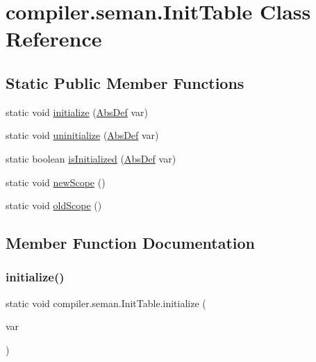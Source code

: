 \hypertarget{classcompiler_1_1seman_1_1_init_table}{}\section{compiler.\+seman.\+Init\+Table Class Reference}
\label{classcompiler_1_1seman_1_1_init_table}
\subsection*{Static Public Member Functions}
\begin{DoxyCompactItemize}
\item 
static void \hyperlink{classcompiler_1_1seman_1_1_init_table_ab1bc216d1fafab32217ef254b68c9569}{initialize} (\hyperlink{classcompiler_1_1abstr_1_1tree_1_1def_1_1_abs_def}{Abs\+Def} var)
\item 
static void \hyperlink{classcompiler_1_1seman_1_1_init_table_a77136e3337120c94621ca98e211672e0}{uninitialize} (\hyperlink{classcompiler_1_1abstr_1_1tree_1_1def_1_1_abs_def}{Abs\+Def} var)
\item 
static boolean \hyperlink{classcompiler_1_1seman_1_1_init_table_af03875273105668a82c23c4da49e0858}{is\+Initialized} (\hyperlink{classcompiler_1_1abstr_1_1tree_1_1def_1_1_abs_def}{Abs\+Def} var)
\item 
static void \hyperlink{classcompiler_1_1seman_1_1_init_table_aef306a1b29699a969e78a1092a8976f5}{new\+Scope} ()
\item 
static void \hyperlink{classcompiler_1_1seman_1_1_init_table_a1c39e093ff7b12c970174aec391c9c4c}{old\+Scope} ()
\end{DoxyCompactItemize}


\subsection{Member Function Documentation}
\mbox{\label{classcompiler_1_1seman_1_1_init_table_ab1bc216d1fafab32217ef254b68c9569}} 
\subsubsection{\texorpdfstring{initialize()}{initialize()}}
{\footnotesize\ttfamily static void compiler.\+seman.\+Init\+Table.\+initialize (\begin{DoxyParamCaption}\item[{\hyperlink{classcompiler_1_1abstr_1_1tree_1_1def_1_1_abs_def}{Abs\+Def}}]{var }\end{DoxyParamCaption})\hspace{0.3cm}{\ttfamily [static]}}

